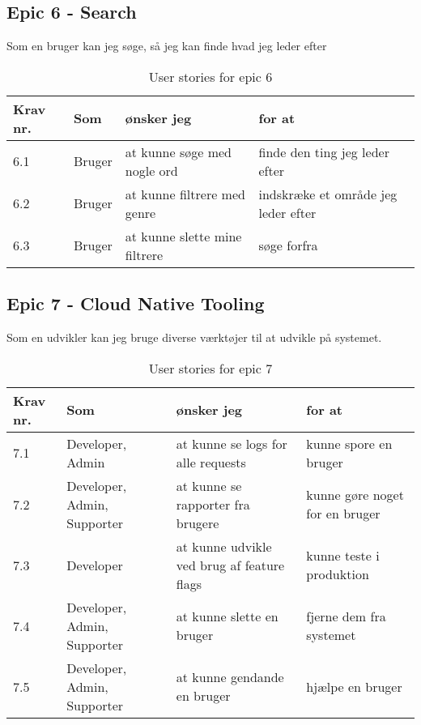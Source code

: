 \subsection{Epic 6 - Search}

Som en bruger kan jeg søge, så jeg kan finde hvad jeg leder efter

\begin{table}[H]
    \centering
    \caption{User stories for epic 6}
    \label{tab:us-epic6}
    \begin{tabular}{p{1cm}|p{2cm}|p{6cm}|p{6cm}}
        \textbf{Krav nr.} & \textbf{Som} & \textbf{ønsker jeg}           & \textbf{for at}                     \\
        \hline
        6.1               & Bruger       & at kunne søge med nogle ord   & finde den ting jeg leder efter      \\
        \hline
        6.2               & Bruger       & at kunne filtrere med genre   & indskræke et område jeg leder efter \\
        \hline
        6.3               & Bruger       & at kunne slette mine filtrere & søge forfra                         \\
    \end{tabular}
\end{table}

\subsection{Epic 7 - Cloud Native Tooling}

Som en udvikler kan jeg bruge diverse værktøjer til at udvikle på systemet.

\begin{table}[H]
    \centering
    \caption{User stories for epic 7}
    \label{tab:us-epic7}
    \begin{tabular}{p{1cm}|p{2cm}|p{6cm}|p{6cm}}
        \textbf{Krav nr.} & \textbf{Som}                & \textbf{ønsker jeg}                        & \textbf{for at}                \\\hline
        7.1               & Developer, Admin            & at kunne se logs for alle requests         & kunne spore en bruger          \\\hline
        7.2               & Developer, Admin, Supporter & at kunne se rapporter fra brugere          & kunne gøre noget for en bruger \\\hline
        7.3               & Developer                   & at kunne udvikle ved brug af feature flags & kunne teste i produktion       \\\hline
        7.4               & Developer, Admin, Supporter & at kunne slette en bruger                  & fjerne dem fra systemet        \\\hline
        7.5               & Developer, Admin, Supporter & at kunne gendande en bruger                & hjælpe en bruger               \\
    \end{tabular}
\end{table}
